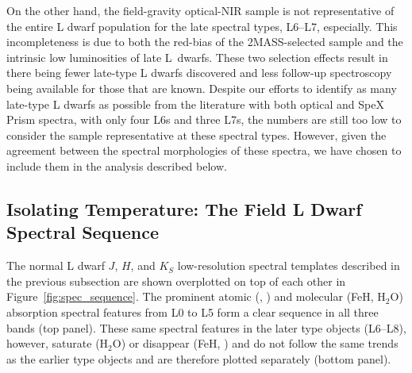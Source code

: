\documentclass[12pt,preprint]{aastex}
\begin{document}
On the other hand, the field-gravity optical-NIR sample is not representative of the entire L dwarf population for the late spectral types, L6--L7, especially. 
This incompleteness is due to both the red-bias of the 2MASS-selected sample and the intrinsic low luminosities of late L~dwarfs.
These two selection effects result in there being fewer late-type L dwarfs discovered and less follow-up spectroscopy being available for those that are known.
Despite our efforts to identify as many late-type L dwarfs as possible from the literature with both optical and SpeX Prism spectra, with only four L6s and three L7s, the numbers are still too low to consider the sample representative at these spectral types.
However, given the agreement between the spectral morphologies of these spectra, we have chosen to include them in the analysis described below.


\subsection{Isolating Temperature: The Field L Dwarf Spectral Sequence}
\label{sec:temp}
The normal L dwarf $J$, $H$, and $K_S$ low-resolution spectral templates described in the previous subsection are shown overplotted on top of each other in Figure~\ref{fig:spec_sequence}. 
The prominent atomic (, ) and molecular (FeH, H$_2$O) absorption spectral features from L0 to L5 form a clear sequence in all three bands (top panel).
These same spectral features in the later type objects (L6--L8), however, saturate (H$_2$O) or disappear (FeH, ) and do not follow the same trends as the earlier type objects and are therefore plotted separately (bottom panel).

\end{document}
